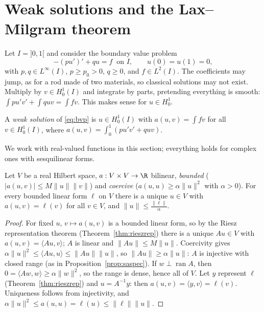 \section{Weak solutions and the Lax--Milgram theorem}

Let $I=]0,1[$ and consider the boundary value problem
\begin{equation}\label{eq:bvp}
-(pu')'+qu=f\ \text{ on }I,\qquad u(0)=u(1)=0,
\end{equation}
with $p,q\in L^\infty(I)$, $p\ge p_0>0$, $q\ge0$, and $f\in L^2(I)$. The coefficients may jump, as for a rod made of two materials, so classical solutions may not exist. Multiply by $v\in H^1_0(I)$ and integrate by
parts, pretending everything is smooth: $\int pu'v'+\int quv=\int fv$. This makes sense for $u\in H^1_0$.

\begin{definition}
A \emph{weak solution} of \eqref{eq:bvp} is $u\in H^1_0(I)$ with $a(u,v)=\int fv$ for all $v\in H^1_0(I)$, where $a(u,v)=\int_0^1(pu'v'+quv)$.
\end{definition}

We work with real-valued functions in this section; everything holds for complex ones with sesquilinear forms.

\begin{theorem}\label{thm:laxmilgram}
Let $V$ be a real Hilbert space, $a:V\times V\to\R$ bilinear, \emph{bounded} ($|a(u,v)|\le M\|u\|\|v\|$) and \emph{coercive} ($a(u,u)\ge\alpha\|u\|^2$ with $\alpha>0$). For every bounded linear form $\ell$ on $V$ there is a unique
$u\in V$ with $a(u,v)=\ell(v)$ for all $v\in V$, and $\|u\|\le\frac{\|\ell\|}\alpha$.
\end{theorem}
\begin{proof}
For fixed $u$, $v\mapsto a(u,v)$ is a bounded linear form, so by the Riesz representation theorem (Theorem~\ref{thm:rieszrep}) there is a unique $Au\in V$ with $a(u,v)=\langle Au,v\rangle$; $A$ is linear and $\|Au\|\le M\|u\|$. Coercivity gives
$\alpha\|u\|^2\le\langle Au,u\rangle\le\|Au\|\|u\|$, so $\|Au\|\ge\alpha\|u\|$: $A$ is injective with closed range (as in Proposition~\ref{prop:saspec}). If $w\perp\operatorname{ran}A$, then $0=\langle Aw,w\rangle\ge\alpha\|w\|^2$, so the range is dense,
hence all of $V$. Let $y$ represent $\ell$ (Theorem~\ref{thm:rieszrep}) and $u=A^{-1}y$: then $a(u,v)=\langle y,v\rangle=\ell(v)$. Uniqueness follows from injectivity, and $\alpha\|u\|^2\le a(u,u)=\ell(u)\le\|\ell\|\|u\|$.
\end{proof}

